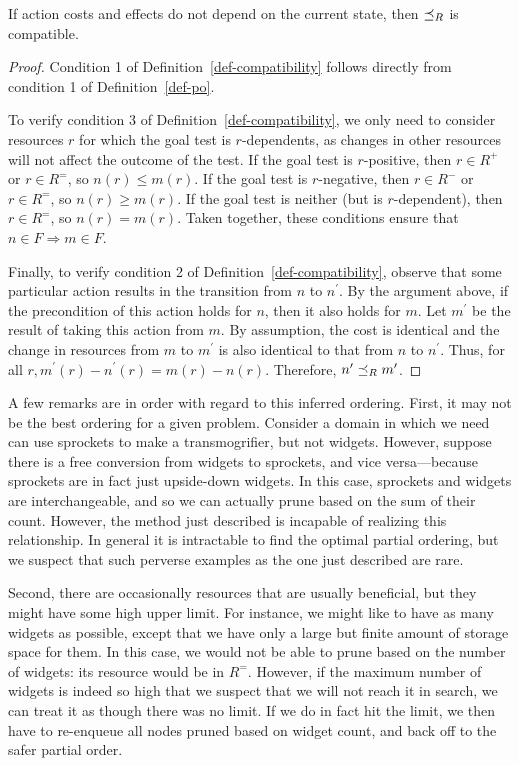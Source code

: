 \documentclass[letterpaper]{article}
\theoremstyle{plain} \newtheorem{theorem}{Theorem} \newtheorem{proposition}{Proposition} \newtheorem{lemma}{Lemma}
\theoremstyle{definition} \newtheorem{definition}{Definition} \newtheorem{conjecture}{Conjecture} \newtheorem*{example}{Example}
\theoremstyle{remark} \newtheorem*{remark}{Remark} \newtheorem*{note}{Note} \newtheorem{case}{Case}
\begin{document}
\begin{claim}{}{\label{clm-po-compatible}}
	If action costs and effects do not depend on the current state, then $\preceq_R$ is compatible.
\end{claim}
\begin{proof}
	Condition 1 of Definition~\ref{def-compatibility} follows directly from condition 1 of Definition~\ref{def-po}.
	
	To verify condition 3 of Definition~\ref{def-compatibility},
  we only need to consider resources $r$ for which the goal
  test is $r$-dependents, as changes in other resources will not affect the outcome of the test. If the goal test is $r$-positive, then $r \in R^+$ or $r \in R^=$, so $n(r) \le m(r)$. If the goal test is $r$-negative, then $r \in R^-$ or $r \in R^=$, so $n(r) \ge m(r)$. If the goal test is neither (but is $r$-dependent), then $r \in R^=$, so $n(r) = m(r)$. Taken together, these conditions ensure that $n \in F \Rightarrow m \in F$.
	
	Finally, to verify condition 2 of Definition~\ref{def-compatibility}, observe that some particular action results in the transition from $n$ to $n^\prime$. By the argument above, if the precondition of this action holds for $n$, then it also holds for $m$. Let
  $m^\prime$ be the result of taking this action from $m$. By
  assumption, the cost is identical and the change in resources
  from $m$ to $m^\prime$ is also identical to that from $n$ to
  $n^\prime$. Thus, for all $r, m^\prime(r) -
  n^\prime(r) = m(r) - n(r)$. Therefore, $n^\prime \preceq_R m^\prime$.
\end{proof}

A few remarks are in order with regard to this inferred ordering.
First, it may not be the best ordering for a given problem. Consider
a domain in which we need can use sprockets to make a transmogrifier,
but not widgets. However, suppose there is a free conversion from
widgets to sprockets, and vice versa---because sprockets are in
fact just upside-down widgets. In this case, sprockets and widgets
are interchangeable, and so we can actually prune based on the sum
of their count. However, the method just described is incapable of
realizing this relationship. In general it is intractable to find
the optimal partial ordering, but we suspect that such perverse
examples as the one just described are rare.

Second, there are occasionally resources that are usually beneficial,
but they might have some high upper limit. For instance, we might
like to have as many widgets as possible, except that we have only
a large but finite amount of storage space for them.  In this case,
we would not be able to prune based on the number of widgets: its
resource would be in $R^=$. However, if the maximum number of widgets
is indeed so high that we suspect that we will not reach it in
search, we can treat it as though there was no limit. If we do in
fact hit the limit, we then have to re-enqueue all nodes pruned
based on widget count, and back off to the safer partial order.
\end{document}
